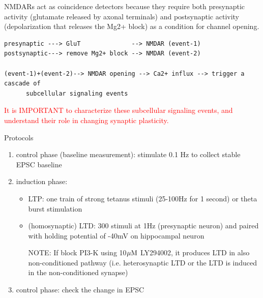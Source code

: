 NMDARs act as coincidence detectors because they require both presynaptic
activity (glutamate released by axonal terminals) and postsynaptic activity
(depolarization that releases the Mg2+ block) as a condition for channel
opening.
\begin{verbatim}
presynaptic ---> GluT              --> NMDAR (event-1)
postsynaptic---> remove Mg2+ block --> NMDAR (event-2)

(event-1)+(event-2)--> NMDAR opening --> Ca2+ influx --> trigger a cascade of
      subcellular signaling events 
\end{verbatim}
\textcolor{red}{It is IMPORTANT to characterize these subcellular signaling
events, and understand their role in changing synaptic plasticity.}


Protocols
\begin{enumerate}
  \item control phase (baseline measurement): stimulate 0.1 Hz to collect stable
  EPSC baseline
  
  \item induction phase: 
  \begin{itemize}

    \item LTP: one train of strong tetanus stimuli (25-100Hz for 1 second) or
    theta burst stimulation

     \item (homosynaptic) LTD: 300 stimuli at 1Hz (presynaptic neuron) and
     paired with holding potential of -40mV on hippocampal neuron
     
    NOTE: If block PI3-K using 10${\mu\text{M}}$ LY294002, it produces LTD in also
    non-conditioned pathway (i.e. heterosynaptic LTD or the LTD is induced in
    the non-conditioned synapse)
  \end{itemize}
  
  
  \item control phase: check the change in EPSC 
\end{enumerate}

